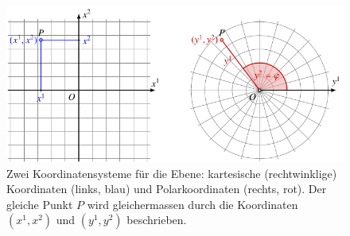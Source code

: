 %
%
%
\begin{figure}
\centering
\includegraphics{chapters/020-koordinaten/images/kartpolar.pdf}
\caption{Zwei Koordinatensysteme für die Ebene:
kartesische (rechtwinklige) Koordinaten (links, {\color{blue}blau})
und Polarkoordinaten (rechts, {\color{darkred}rot}).
Der gleiche Punkt $P$ wird gleichermassen durch die Koordinaten 
$(x^1,x^2)$ und $(y^1,y^2)$ beschrieben.
\label{buch:koordinaten:fig:kartpolar}}
\end{figure}
